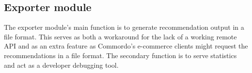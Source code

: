 
\subsection{Exporter module}

The exporter module's main function is to generate recommendation output in a file format. This serves as both a workaround for the lack of a working remote API and as an extra feature as Commordo's e-commerce clients might request the recommendations in a file format.  The secondary function is to serve statistics and act as a developer debugging tool.


